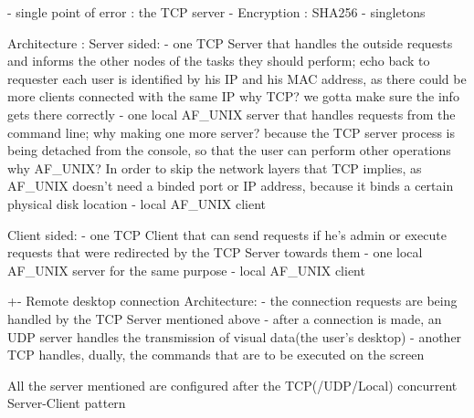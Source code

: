 - single point of error : the TCP server
- Encryption : SHA256
- singletons

Architecture : 
Server sided:
- one TCP Server that handles the outside requests and informs the other nodes of the tasks they should perform; echo back to requester
	each user is identified by his IP and his MAC address, as there could be more clients connected with the same IP
	why TCP? we gotta make sure the info gets there correctly
- one local AF_UNIX server that handles requests from the command line;
	why making one more server? because the TCP server process is being detached from the console, so that the user can perform other operations
	why AF_UNIX? In order to skip the network layers that TCP implies, as AF_UNIX doesn't need a binded port or IP address, because it binds a certain physical disk location
- local AF_UNIX client

Client sided:
- one TCP Client that can send requests if he's admin or execute requests that were redirected by the TCP Server towards them
- one local AF_UNIX server for the same purpose
- local AF_UNIX client

+- Remote desktop connection
Architecture:
- the connection requests are being handled by the TCP Server mentioned above
- after a connection is made, an UDP server handles the transmission of visual data(the user's desktop)
- another TCP handles, dually, the commands that are to be executed on the screen

All the server mentioned are configured after the TCP(/UDP/Local) concurrent Server-Client pattern